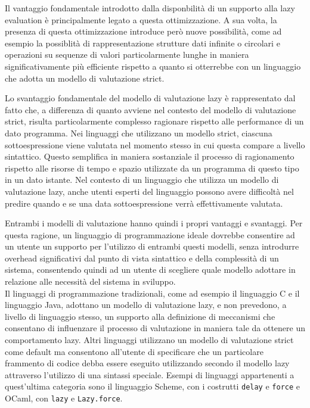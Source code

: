 Il vantaggio fondamentale introdotto dalla disponbilità di un supporto alla lazy
evaluation è principalmente legato a questa ottimizzazione. A sua volta, la
presenza di questa ottimizzazione introduce però nuove possibilità, come ad
esempio la possiblità di rappresentazione strutture dati infinite o circolari e
operazioni su sequenze di valori particolarmente lunghe in maniera
significativamente più efficiente rispetto a quanto si otterrebbe con un
linguaggio che adotta un modello di valutazione strict.

Lo svantaggio fondamentale del modello di valutazione lazy è rappresentato dal
fatto che, a differenza di quanto avviene nel contesto del modello di
valutazione strict, risulta particolarmente complesso ragionare rispetto alle
performance di un dato programma. Nei linguaggi che utilizzano un modello
strict, ciascuna sottoespressione viene valutata nel momento stesso in cui
questa compare a livello sintattico. Questo semplifica in maniera sostanziale il
processo di ragionamento rispetto alle risorse di tempo e spazio utilizzate da
un programma di questo tipo in un dato istante. Nel contesto di un linguaggio
che utilizza un modello di valutazione lazy, anche utenti esperti del linguaggio
possono avere difficoltà nel predire quando e se una data sottoespressione verrà
effettivamente valutata.

Entrambi i modelli di valutazione hanno quindi i propri vantaggi e svantaggi.
Per questa ragione, un linguaggio di programmazione ideale dovrebbe consentire
ad un utente un supporto per l'utilizzo di entrambi questi modelli, senza
introdurre overhead significativi dal punto di vista sintattico e della
complessità di un sistema, consentendo quindi ad un utente di scegliere quale
modello adottare in relazione alle necessità del sistema in sviluppo.\\

Il linguaggi di programmazione tradizionali, come ad esempio il linguaggio C e
il linguaggio Java, adottano un modello di valutazione lazy, e non prevedono, a
livello di linguaggio stesso, un supporto alla definizione di meccanismi che
consentano di influenzare il processo di valutazione in maniera tale da ottenere
un comportamento lazy. Altri linguaggi utilizzano un modello di valutazione
strict come default ma consentono all'utente di specificare che un particolare
frammento di codice debba essere eseguito utilizzando secondo il modello lazy
attraverso l'utilizzo di una sintassi speciale. Esempi di linguaggi appartenenti
a quest'ultima categoria sono il linguaggio Scheme, con i costrutti
\texttt{delay} e \texttt{force} e OCaml, con \texttt{lazy} e
\texttt{Lazy.force}.

